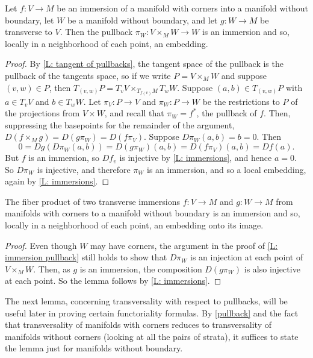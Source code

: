 \begin{lemma}\label{L: immersion pullback}
	Let $f \colon V \to M$ be an immersion of a manifold with corners into a manifold without boundary, let $W$ be a manifold without boundary, and let $g \colon W \to M$ be transverse to $V$. 
	Then the pullback $\pi_W: V \times_M W \to W$ is an immersion and so, locally in a neighborhood of each point, an embedding.
\end{lemma}
\begin{proof}
	By \cref{L: tangent of pullbacks}, the tangent space of the pullback is the pullback of the tangents space, so if we write $P = V \times_M W$ and suppose $(v,w) \in P$, then $T_{(v,w)}P = T_vV \times_{T_{f(v)}M} T_wW$. 
	Suppose $(a,b) \in T_{(v,w)}P$ with $a \in T_vV$ and $b \in T_wW$. 
	Let $\pi_V \colon P \to V$ and $\pi_W \colon P \to W$ be the restrictions to $P$ of the projections from $V \times W$, and recall that $\pi_W = f^*$, the pullback of $f$.
	Then, suppressing the basepoints for the remainder of the argument, $D(f \times_M g) = D(g\pi_W) = D(f \pi_V)$.
	Suppose $D\pi_W(a,b)= b = 0$. 
	Then $$0 = Dg(D\pi_W(a,b))= D(g\pi_W)(a,b) = D(f \pi_V)(a,b) = Df(a).$$
	But $f$ is an immersion, so $Df_v$ is injective by \cref{L: immersions}, and hence $a=0$. 
	So $D\pi_W$ is injective, and therefore $\pi_W$ is an immersion, and so a local embedding, again by \cref{L: immersions}. 
\end{proof}


\begin{lemma}
	The fiber product of two transverse immersions $f \colon V \to M$ and $g \colon W \to M$ from manifolds with corners to a manifold without boundary is an immersion and so, locally in a neighborhood of each point, an embedding onto its image.
\end{lemma}
\begin{proof}
	Even though $W$ may have corners, the argument in the proof of \cref{L: immersion pullback} still holds to show that $D \pi_W$ is an injection at each point of $V \times_M W$. 
	Then, as $g$ is an immersion, the composition $D(g \pi_W)$ is also injective at each point.
	So the lemma follows by \cref{L: immersions}.
\end{proof}

The next lemma, concerning transversality with respect to pullbacks, will be useful later in proving certain functoriality formulas. 
By \cref{pullback} and the fact that transversality of manifolds with corners reduces to transversality of manifolds without corners (looking at all the pairs of strata), it suffices to state the lemma just for manifolds without boundary.

